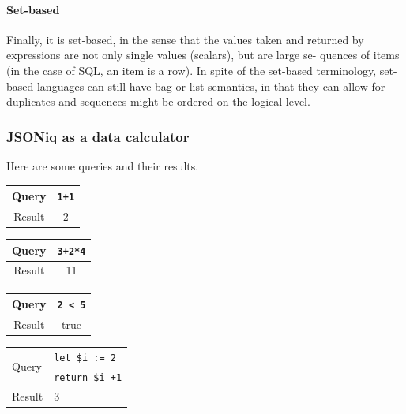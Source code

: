 \paragraph{Set-based}
Finally, it is set-based, in the sense that the values taken and returned by expressions are not only single values (scalars), but are large se- quences of items (in the case of SQL, an item is a row). In spite of the set-based terminology, set-based languages can still have bag or list semantics, in that they can allow for duplicates and sequences might be ordered on the logical level.


\subsubsection{JSONiq as a data calculator}

Here are some queries and their results.

\vspace{1\baselineskip}

\noindent
\begin{minipage}{0.16\textwidth}
\begin{center}
    \begin{tabular}{|c|c|}
        \hline
        Query & \texttt{1+1} \\ \hline
        Result & 2 \\ \hline
    \end{tabular}
\end{center}
\end{minipage}
\begin{minipage}{0.2\textwidth}
\begin{center}
    \begin{tabular}{|c|c|}
        \hline
        Query & \texttt{3+2*4} \\ \hline
        Result & 11 \\ \hline
    \end{tabular}
\end{center}
\end{minipage}
\begin{minipage}{0.2\textwidth}
\begin{center}
    \begin{tabular}{|c|c|}
        \hline
        Query & \texttt{2 < 5} \\ \hline
        Result & true \\ \hline
    \end{tabular}
\end{center}
\end{minipage}
\begin{minipage}{0.3\textwidth}
\begin{center}
    \begin{tabular}{|l|l|}
        \hline
        \multirow{2}{*}{Query} & \texttt{let \$i := 2} \\
         & \texttt{return \$i +1} \\ \hline
        Result & 3 \\ \hline
    \end{tabular}
\end{center}
\end{minipage}

